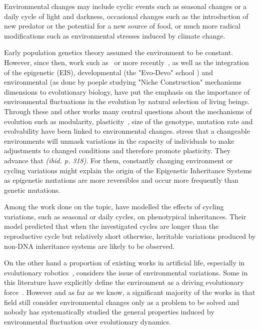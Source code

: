Environmental changes may include cyclic events such as seasonal changes or a daily cycle of light and darkness, occasional changes such as the introduction of new predator or the potential for a new source of food, or much more radical modifications such as environmental stresses induced by climate change.

Early population genetics theory assumed the environment to be constant. However, since then, work such as~\citep{levins1968evolution} or more recently~\citep{jablonka2014evolution}, as well as the integration of the epigenetic (EIS), developmental (the "Evo-Devo" school \citep{muller2007evodevoextendingtheevolutionarysynthesis}) and environmental (as done by poeple studying "Niche Construction" mechanisms~\citep{laland2016anintroductiontonicheconstructiontheory} dimensions to evolutionary biology, have put the emphasis on the importance of environmental fluctuations in the evolution by natural selection of living beings. Through these and other works many central questions about the mechanisms of evolution such as modularity, plasticity~\citep{west2005developmental}, size of the genotype, mutation rate and evolvability have been linked to environmental changes. \cite{jablonka2014evolution} stress that a changeable environments will unmask variations in the capacity of individuals to make adjustments to changed conditions and therefore promote plasticity. They advance that \emph{(ibid. p. 318)}. For them, constantly changing environment or cycling variations might explain the origin of the Epigenetic Inheritance Systems~\cite{heard2014transgenerationalepigeneticinheritancemythsandmechanisms} as epigenetic mutations are more reversibles and occur more frequently than genetic mutations. 

Among the work done on the topic, \cite{lachmann1996inheritance} have modelled the effects of cycling variations, such as seasonal or daily cycles, on phenotypical inheritances. Their model predicted that when the investigated cycles are longer than the reproductive cycle but relatively short otherwise, heritable variations produced by non-DNA inheritance systems are likely to be observed. 

On the other hand a proportion of existing works in artificial life, especially in evolutionary robotics~\citep{floreano2000evolutionary}, considers the issue of environmental variations. Some in this literature have explicitly define the environment as a driving evolutionary force~\citep{bredeche2012environmentdrivenopenende}. However and as far as we know, a significant majority of the works in that field still consider environmental changes only as a problem to be solved and nobody has systematically studied the general properties induced by environmental fluctuation over evolutionary dynamics.  %

